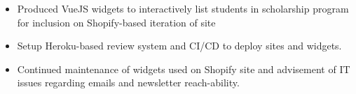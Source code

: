 \documentclass[10pt,letter,ragged2e]{altacv}
\begin{document}
\begin{paracol}{2}
\begin{itemize}
\end{itemize}

\begin{itemize}
\item Produced VueJS widgets to interactively list students in scholarship program for inclusion on Shopify-based iteration of site
\item Setup Heroku-based review system and CI/CD to deploy sites and widgets.
\item Continued maintenance of widgets used on Shopify site and advisement of IT issues regarding emails and newsletter reach-ability.
\end{itemize}





\end{paracol}
\end{document}

